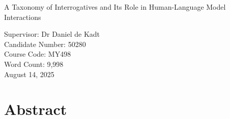 \documentclass[
  12pt,
]{article}
\author{}
\date{\vspace{-2.5em}}
\begin{document}
\vspace*{6em}

\begin{center}
{\normalfont\LARGE
\begin{spacing}{1.75}
\begin{minipage}{0.85\textwidth}\centering
A Taxonomy of Interrogatives and Its Role in Human-Language Model Interactions
\end{minipage}
\end{spacing}
}

\vspace{3em} %

Supervisor: Dr Daniel de Kadt\\
Candidate Number: 50280\\
Course Code: MY498\\
Word Count: 9,998\\
August 14, 2025
\end{center}

\clearpage

\section{Abstract}\label{abstract}

\vspace{-0.5em}
\end{document}
